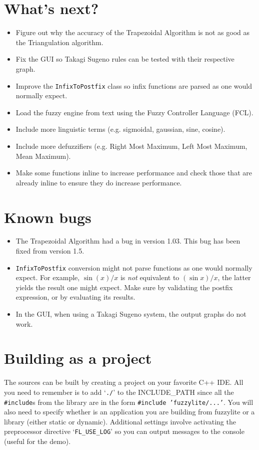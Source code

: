 \section{What's next?}
	\begin{itemize}
	  \item Figure out why the accuracy of the Trapezoidal Algorithm is not as good
	  as the Triangulation algorithm.
		\item Fix the GUI so Takagi Sugeno rules can be tested with their respective graph.
		\item Improve the \texttt{InfixToPostfix} class so infix functions are parsed as one would normally expect.
		\item Load the fuzzy engine from text using the Fuzzy Controller Language (FCL).
		\item Include more linguistic terms (e.g. sigmoidal, gaussian, sine, cosine).
		\item Include more defuzzifiers (e.g. Right Most Maximum, Left Most Maximum, Mean Maximum).
		\item Make some functions inline to increase performance and check those that are already inline to ensure they do increase performance.
	\end{itemize}
	
	\section{Known bugs}
	\begin{itemize}
	
	  \item The Trapezoidal Algorithm had a bug in version 1.03. This bug has been fixed from version 1.5.
		\item \texttt{InfixToPostfix} conversion might not parse functions as one would normally expect. For example, $\sin (x) / x$ is \emph{not} equivalent to $(\sin x) / x$, the latter yields the result one might expect. Make sure by validating the postfix expression, or by evaluating its results.
		\item In the GUI, when using a Takagi Sugeno system, the output graphs do not work.
	\end{itemize}
	
\section{Building as a project}

The sources can be built by creating a project on your favorite C++ IDE. All you need to remember is to add `\texttt{./}' to the INCLUDE\_PATH since all the \texttt{\#include}s from the library are in the form \texttt{\#include 'fuzzylite/...'}. You will also need to specify whether is an application you are building from fuzzylite or a library (either static or dynamic). Additional settings involve activating the preprocessor directive `\texttt{FL\_USE\_LOG}' so you can output messages to the console (useful for the demo).

